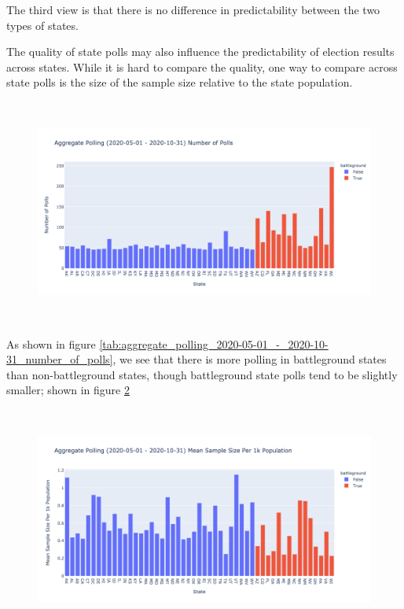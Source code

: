 The third view is that there is no difference in predictability between the two types of states.

The quality of state polls may also influence the predictability of election results across states. While it is hard to compare the quality, one way to compare across state polls is the size of the sample size relative to the state population. 


\begin{figure}[H]
    \centering
    \includegraphics[height=20em]{figures/aggregate_polling_2020-05-01_-_2020-10-31_number_of_polls.png}
    \caption{}
    \label{fig:aggregate_polling_2020-05-01_-_2020-10-31_number_of_polls}
\end{figure}

\begin{table}[H]

    \label{tab:aggregate_polling_2020-05-01_-_2020-10-31_number_of_polls}
\end{table}

As shown in figure \ref{tab:aggregate_polling_2020-05-01_-_2020-10-31_number_of_polls}, we see that there is more polling in battleground states than non-battleground states, though battleground state polls tend to be slightly smaller; shown in figure \ref{fig:aggregate_polling_2020-05-01_-_2020-10-31_mean_sample_size_per_1k_population}\\

\begin{figure}[H]
    \centering
    \includegraphics[height=20em]{figures/aggregate_polling_2020-05-01_-_2020-10-31_mean_sample_size_per_1k_population.png}
    \caption{}
    \label{fig:aggregate_polling_2020-05-01_-_2020-10-31_mean_sample_size_per_1k_population}
\end{figure}

